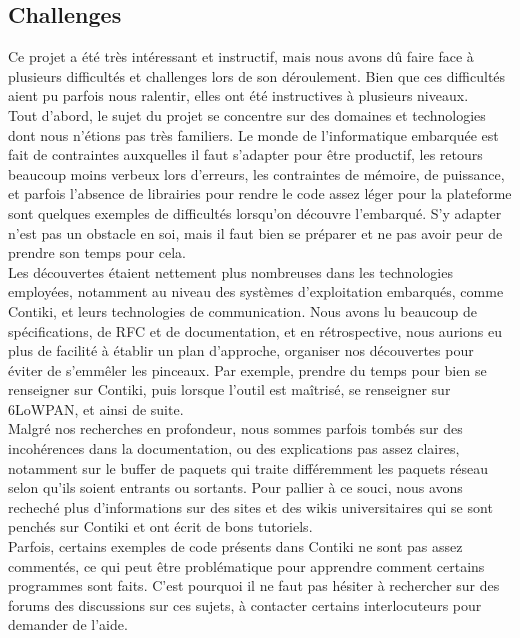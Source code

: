 	\subsection{Challenges} %
	    Ce projet a été très intéressant et instructif, mais nous avons dû faire face à plusieurs difficultés et challenges lors de son déroulement. Bien que ces difficultés aient pu parfois nous ralentir, elles ont été instructives à plusieurs niveaux.\\
	    Tout d'abord, le sujet du projet se concentre sur des domaines et technologies dont nous n'étions pas très familiers. Le monde de l'informatique embarquée est fait de contraintes auxquelles il faut s'adapter pour être productif, les retours beaucoup moins verbeux lors d'erreurs, les contraintes de mémoire, de puissance, et parfois l'absence de librairies pour rendre le code assez léger pour la plateforme sont quelques exemples de difficultés lorsqu'on découvre l'embarqué. S'y adapter n'est pas un obstacle en soi, mais il faut bien se préparer et ne pas avoir peur de prendre son temps pour cela.\\
	    Les découvertes étaient nettement plus nombreuses dans les technologies employées, notamment au niveau des systèmes d'exploitation embarqués, comme Contiki, et leurs technologies de communication. Nous avons lu beaucoup de spécifications, de RFC et de documentation, et en rétrospective, nous aurions eu plus de facilité à établir un plan d'approche, organiser nos découvertes pour éviter de s'emmêler les pinceaux. Par exemple, prendre du temps pour bien se renseigner sur Contiki, puis lorsque l'outil est maîtrisé, se renseigner sur 6LoWPAN, et ainsi de suite.\\
	    Malgré nos recherches en profondeur, nous sommes parfois tombés sur des incohérences dans la documentation, ou des explications pas assez claires, notamment sur le buffer de paquets qui traite différemment les paquets réseau selon qu'ils soient entrants ou sortants. Pour pallier à ce souci, nous avons recheché plus d'informations sur des sites et des wikis universitaires qui se sont penchés sur Contiki et ont écrit de bons tutoriels.\\
	    Parfois, certains exemples de code présents dans Contiki ne sont pas assez commentés, ce qui peut être problématique pour apprendre comment certains programmes sont faits. C'est pourquoi il ne faut pas hésiter à rechercher sur des forums des discussions sur ces sujets, à contacter certains interlocuteurs pour demander de l'aide.

